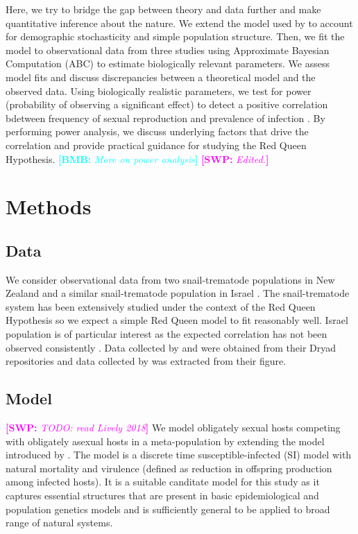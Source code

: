 \documentclass{article}\usepackage[]{graphicx}\usepackage[]{color}
\newcommand{\comment}[3]{\textcolor{#1}{\textbf{[#2: }\textit{#3}\textbf{]}}}
\newcommand{\bmb}[1]{\comment{cyan}{BMB}{#1}}
\newcommand{\swp}[1]{\comment{magenta}{SWP}{#1}}
\begin{document}
Here, we try to bridge the gap between theory and data further and make quantitative inference about the nature.
We extend the model used by \cite{lively2010epidemiological} to account for demographic stochasticity and simple population structure.
Then, we fit the model to observational data from three studies \citep{dagan2013clonal, mckone2016fine, vergara2014infection} using Approximate Bayesian Computation (ABC) to estimate biologically relevant parameters.
We assess model fits and discuss discrepancies between a theoretical model and the observed data.
Using biologically realistic parameters, we test for power (probability of observing a significant effect) to detect a positive correlation bdetween frequency of sexual reproduction and prevalence of infection \cite{lively2001trematode}.
By performing power analysis, we discuss underlying factors that drive the correlation and provide practical guidance for studying the Red Queen Hypothesis.
\bmb{More on power analysis}
\swp{Edited.}

\section{Methods}

\subsection{Data}

We consider observational data from two snail-trematode populations in New Zealand \citep{vergara2014infection, mckone2016fine} and a similar snail-trematode population in Israel \citep{dagan2013clonal}. 
The snail-trematode system has been extensively studied under the context of the Red Queen Hypothesis so we expect a simple Red Queen model to fit reasonably well.
Israel population is of particular interest as the expected correlation has not been observed consistently \citep{ben2005spatial, dagan2013clonal}.
Data collected by \cite{dagan2013clonal} and \cite{vergara2014infection} were obtained from their Dryad repositories \citep{dryad_f5t56, dryad_29nk3_2} and data collected by \cite{mckone2016fine} was extracted from their figure.

\subsection{Model}

\swp{TODO: read Lively 2018}
We model obligately sexual hosts competing with obligately asexual hosts in a meta-population by extending the model introduced by \cite{lively2010epidemiological}.
The model is a discrete time susceptible-infected (SI) model with natural mortality and virulence (defined as reduction in offspring production among infected hosts).
It is a suitable canditate model for this study as it captures essential structures that are present in basic epidemiological and population genetics models and is sufficiently general to be applied to broad range of natural systems.
\end{document}
